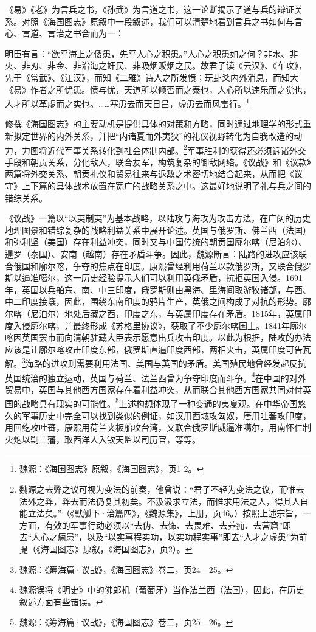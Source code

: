 \documentclass[a4paper, 12pt, openright]{ctexbook}
\renewenvironment{quote}
  {\list{}{\rightmargin2\ccwd \leftmargin2\ccwd \itemindent=2\ccwd \listparindent=2\ccwd}%
   \item\relax\small\kaishu\color{black}}
  {\endlist}
\begin{document}
《易》《老》为言兵之书，《孙武》为言道之书，这一论断揭示了道与兵的辩证关系。对照《海国图志》原叙中一段叙述，我们可以清楚地看到言兵之书如何与言心、言道、言治之书合而为一：

\begin{quote}
明臣有言：“欲平海上之倭患，先平人心之积患。”人心之积患如之何？非水、非火、非刃、非金、非沿海之奸民、非吸烟贩烟之民。故君子读《云汉》、《车攻》，先于《常武》、《江汉》，而知《二雅》诗人之所发愤；玩卦爻内外消息，而知大《易》作者之所忧患。愤与忧，天道所以倾否而之泰也，人心所以违乐而之觉也，人才所以革虚而之实也。……塞患去而天日昌，虚患去而风雷行。\footnote{魏源：《海国图志》原叙，《海国图志》，页1-2。}
\end{quote}

修撰《海国图志》的主要动机是提供具体的对策和方略，同时通过地理学的形式重新拟定世界的内外关系，并把“内诸夏而外夷狄”的礼仪视野转化为自我改造的动力，力图将近代军事关系转化到社会体制内部。\footnote{魏源之去弊之议可视为变法的前奏，他曾说：“君子不轻为变法之议，而惟去法外之弊，弊去而法仍复其初矣。不汲汲求立法，而惟求用法之人，得其人自能立法矣。”（《默觚下·治篇四》，《魏源集》，上册，页46。）按照上述宗旨，一方面，有效的军事行动必须以“去伪、去饰、去畏难、去养痈、去营窟”即去“人心之痫患”，以及“以实事程实功，以实功程实事”即去“人才之虚患”为前提（《海国图志》原叙，《海国图志》，页2）。}军事胜利的获得还必须诉诸外交手段和朝贡关系，分化敌人，联合友军，构筑复杂的御敌网络。《议战》和《议款》两篇将外交关系、朝贡礼仪和贸易往来与退敌之术密切地结合起来，从而把《议守》上下篇的具体战术放置在宽广的战略关系之中。这最好地说明了礼与兵之间的错综关系。

《议战》一篇以“以夷制夷”为基本战略，以陆攻与海攻为攻击方法，在广阔的历史地理图景和错综复杂的战略利益关系中展开论述。英国与俄罗斯、佛兰西（法国）和弥利坚（美国）存在利益冲突，同时又与中国传统的朝贡国廓尔喀（尼泊尔）、暹罗（泰国）、安南（越南）存在矛盾斗争。因此，魏源断言：陆路的进攻应该联合俄国和廓尔喀，争夺的焦点在印度。康熙曾经利用荷兰以款俄罗斯，又联合俄罗斯以逼准噶尔，这一历史经验提示人们可以利用英俄矛盾，抗拒英国入侵。1691年，英国以兵舶东、南、中三印度，俄罗斯则由黑海、里海间取游牧诸部，与西、中二印度接壤，因此，围绕东南印度的鸦片生产，英俄之间构成了对抗的形势。廓尔喀（尼泊尔）地处后藏之西，印度之东，与英属印度存在矛盾。1815年，英属印度入侵廓尔喀，并最终形成《苏格里协议》，获取了不少廓尔喀国土。1841年廓尔喀因英国罢市而向清朝驻藏大臣表示愿意出兵攻击印度。以此为根据，陆攻的办法应该是让廓尔喀攻击印度东部，俄罗斯直逼印度西部，两相夹击，英属印度可告瓦解。\footnote{魏源：《筹海篇·议战》，《海国图志》卷二，页24—25。}海路的进攻则需要利用法国、美国与英国的矛盾。美国殖民地曾经发起反抗英国统治的独立运动，英国与荷兰、法兰西曾为争夺印度而斗争。\footnote{魏源误将《明史》中的佛郎机（葡萄牙）当作法兰西（法国），因此，在历史叙述方面有些错误。}在中国的对外贸易中，英国与其他西方国家存在着利益冲突，从而联合其他西方国家共同对付英国的战略具有现实的可能性。\footnote{魏源：《筹海篇·议战》，《海国图志》卷二，页25—26。}上述构想体现了一种变通的夷夏观。在中华帝国悠久的军事历史中完全可以找到类似的例证，如汉用西域攻匈奴，唐用吐蕃攻印度，用回纥攻吐蕃，康熙用荷兰夹板船攻台湾，又联合俄罗斯威逼准噶尔，用南怀仁制火炮以剿三藩，取西洋人入钦天监以司历官，等等。
\end{document}
